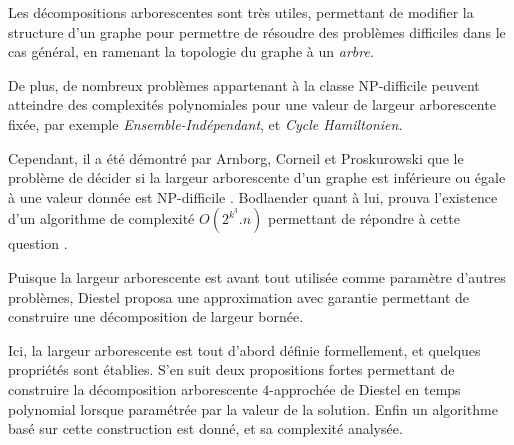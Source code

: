 

Les décompositions arborescentes sont très utiles, permettant
de modifier la structure d'un graphe pour permettre de résoudre
des problèmes difficiles dans le cas général, en ramenant la topologie
du graphe à un {\em arbre}.

De plus, de nombreux problèmes appartenant à la classe NP-difficile
peuvent atteindre des complexités polynomiales pour une valeur de
largeur arborescente fixée, par exemple {\em Ensemble-Indépendant},
et {\em Cycle Hamiltonien}.

Cependant, il a été démontré par Arnborg, Corneil et Proskurowski que le
problème de décider si la largeur arborescente d'un graphe est inférieure
ou égale à une valeur donnée est NP-difficile \cite{arnborg}.
Bodlaender quant à lui, prouva l'existence d'un 
algorithme de complexité $O(2^{k^3}.n)$ permettant de répondre
à cette question \cite{bodlaender}.

Puisque la largeur arborescente est avant tout utilisée comme
paramètre d'autres problèmes, Diestel \cite{diestel} proposa une approximation
avec garantie permettant de construire une décomposition de largeur
bornée.

Ici, la largeur arborescente est tout d'abord définie formellement, et quelques propriétés
sont établies. S'en suit deux propositions fortes permettant de
construire la
décomposition arborescente $4$-approchée de Diestel
en temps polynomial lorsque paramétrée par
la valeur de la solution.
Enfin un algorithme basé sur cette construction est donné, et sa complexité analysée.


